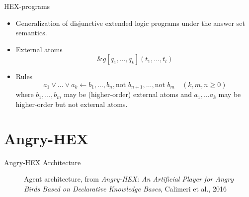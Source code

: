 \documentclass[smaller, dvipsnames]{beamer}
\newcommand{\ah}{Angry-HEX\xspace}
\begin{document}
\begin{frame}{HEX-programs}
    \begin{itemize}[<+->]
    	\item Generalization of disjunctive extended logic programs under the answer set semantics.
    	\item External atoms \[ \&g[q_1,\dots,q_k](t_1,\dots,t_l) \]
    	\item Rules \[ a_1 \lor \dots \lor a_k \leftarrow b_1, \dots , b_n, \text{not } b_{n+1}, \dots, \text{not } b_m \quad (k,m,n \geq 0)\] where \(b_1, \dots, b_m\) may be (higher-order) external atoms and \(a_1, \ldots a_k\) may be higher-order but not external atoms. 
    \end{itemize}
\end{frame}

\section{\ah}

\begin{frame}{\ah Architecture}
	\begin{center}
		\begin{figure}
			\caption{Agent architecture, from \emph{Angry-HEX: An Artificial Player for Angry Birds Based on Declarative
			Knowledge Bases}, Calimeri et al., 2016}
		\end{figure}
	\end{center}
\end{frame}
\end{document}
